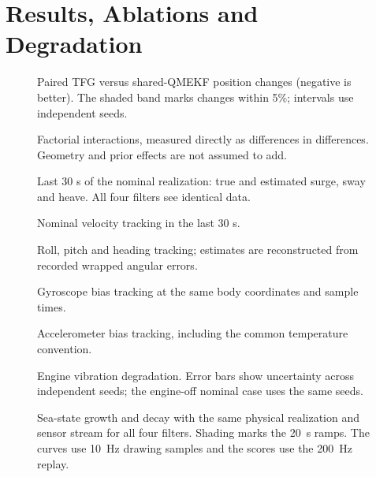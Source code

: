 \documentclass[conference]{IEEEtran}
\newcommand{\fig}[1]{\resizebox{\linewidth}{!}{}}
\begin{document}
\section{Results, Ablations and Degradation}
\ResultsDiscussion
\FailureDiscussion
\HeaveSweepDiscussion
\SupplementDiscussion
\SecondaryDiscussion

\begin{figure}[!t]\centering\fig{paired_position}
\caption{Paired TFG versus shared-QMEKF position changes (negative is better).
The shaded band marks changes within 5\%; intervals use independent seeds.}
\end{figure}
\begin{figure}[!t]\centering\fig{factorial_interaction}
\caption{Factorial interactions, measured directly as differences in
differences. Geometry and prior effects are not assumed to add.}\end{figure}
\begin{figure}[!t]\centering\fig{tail_xyz}
\caption{Last 30 s of the nominal realization: true and estimated surge, sway
and heave. All four filters see identical data.}\end{figure}
\begin{figure}[!t]\centering\fig{tail_velocity}
\caption{Nominal velocity tracking in the last 30 s.}\end{figure}
\begin{figure}[!t]\centering\fig{attitude}
\caption{Roll, pitch and heading tracking; estimates are reconstructed from
recorded wrapped angular errors.}\end{figure}
\begin{figure}[!t]\centering\fig{gyro_bias}
\caption{Gyroscope bias tracking at the same body coordinates and sample times.}\end{figure}
\begin{figure}[!t]\centering\fig{accel_bias}
\caption{Accelerometer bias tracking, including the common temperature convention.}\end{figure}
\begin{figure}[!t]\centering\fig{engine_degradation}
\caption{Engine vibration degradation. Error bars show uncertainty across
independent seeds; the engine-off nominal case uses the same seeds.}\end{figure}
\begin{figure}[!t]\centering\fig{roundtrip}
\caption{Sea-state growth and decay with the same physical realization and
sensor stream for all four filters. Shading marks the 20~s ramps. The curves
use 10~Hz drawing samples and the scores use the 200~Hz replay.}
\end{figure}
\end{document}
